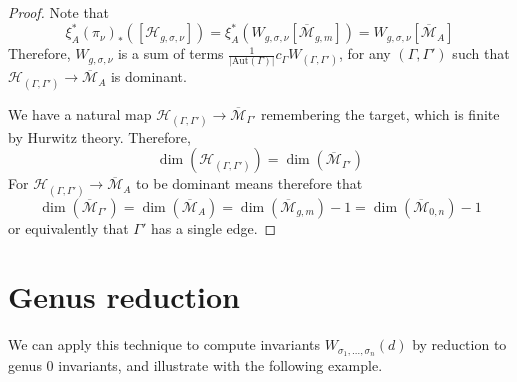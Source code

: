 \documentclass[thesis]{thesis-umich}           %
\newcommand{\mb}{\overline{\mathcal M}}
\newcommand{\Aut}{\text{Aut}}
\theoremstyle{definition}
\begin{document}
\begin{proof}
  Note that
  \[
  \xi_A^*(\pi_{\nu})_*([\mathcal H_{g,\sigma,\nu}]) =
  \xi_A^*(W_{g,\sigma,\nu}[\mb_{g,m}])=
  W_{g,\sigma,\nu}[\mb_A]
  \]
  Therefore, $W_{g,\sigma,\nu}$ is a sum of
  terms $\frac 1{|\Aut(\Gamma)|}c_{\Gamma}W_{(\Gamma,\Gamma')}$, for
  any $(\Gamma,\Gamma')$ such that
  $\mathcal H_{(\Gamma,\Gamma')}\to\mb_A$
  is dominant.

  We have a natural map $\mathcal H_{(\Gamma,\Gamma')}\to \mb_{\Gamma'}$ remembering the target, which is finite by Hurwitz theory. Therefore,
  \[
  \dim(\mathcal H_{(\Gamma,\Gamma')})=\dim(\mb_{\Gamma'})
  \]
  For $\mathcal H_{(\Gamma,\Gamma')}\to\mb_A$ to be
  dominant means therefore that
  \[
  \dim(\mb_{\Gamma'})=\dim(\mb_A)=
  \dim(\mb_{g,m})-1=\dim(\mb_{0,n})-1
  \]
  or equivalently that $\Gamma'$ has a single edge.
\end{proof}

\section{Genus reduction}

We can apply this technique to compute invariants $W_{\sigma_1,\dots,\sigma_n}(d)$ by reduction to
genus $0$ invariants, and illustrate with the following example.
\end{document}
